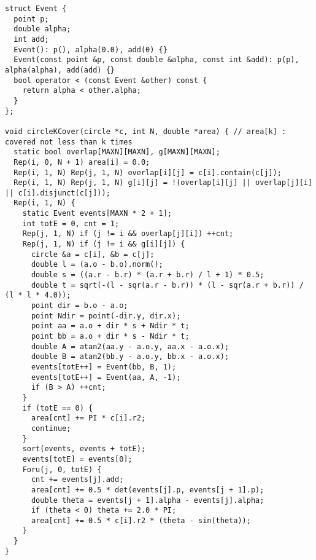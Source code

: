 \begin{lstlisting}
struct Event {
  point p;
  double alpha;
  int add;
  Event(): p(), alpha(0.0), add(0) {}
  Event(const point &p, const double &alpha, const int &add): p(p), alpha(alpha), add(add) {}
  bool operator < (const Event &other) const {
    return alpha < other.alpha;
  }
};

void circleKCover(circle *c, int N, double *area) { // area[k] : covered not less than k times
  static bool overlap[MAXN][MAXN], g[MAXN][MAXN];
  Rep(i, 0, N + 1) area[i] = 0.0;
  Rep(i, 1, N) Rep(j, 1, N) overlap[i][j] = c[i].contain(c[j]);
  Rep(i, 1, N) Rep(j, 1, N) g[i][j] = !(overlap[i][j] || overlap[j][i] || c[i].disjunct(c[j]));
  Rep(i, 1, N) {
    static Event events[MAXN * 2 + 1];
    int totE = 0, cnt = 1;
    Rep(j, 1, N) if (j != i && overlap[j][i]) ++cnt;
    Rep(j, 1, N) if (j != i && g[i][j]) {
      circle &a = c[i], &b = c[j];
      double l = (a.o - b.o).norm();
      double s = ((a.r - b.r) * (a.r + b.r) / l + 1) * 0.5;
      double t = sqrt(-(l - sqr(a.r - b.r)) * (l - sqr(a.r + b.r)) / (l * l * 4.0));
      point dir = b.o - a.o;
      point Ndir = point(-dir.y, dir.x);
      point aa = a.o + dir * s + Ndir * t;
      point bb = a.o + dir * s - Ndir * t;
      double A = atan2(aa.y - a.o.y, aa.x - a.o.x);
      double B = atan2(bb.y - a.o.y, bb.x - a.o.x);
      events[totE++] = Event(bb, B, 1);
      events[totE++] = Event(aa, A, -1);
      if (B > A) ++cnt;
    }
    if (totE == 0) {
      area[cnt] += PI * c[i].r2;
      continue;
    }
    sort(events, events + totE);
    events[totE] = events[0];
    Foru(j, 0, totE) {
      cnt += events[j].add;
      area[cnt] += 0.5 * det(events[j].p, events[j + 1].p);
      double theta = events[j + 1].alpha - events[j].alpha;
      if (theta < 0) theta += 2.0 * PI;
      area[cnt] += 0.5 * c[i].r2 * (theta - sin(theta));
    }
  }
}

\end{lstlisting}
